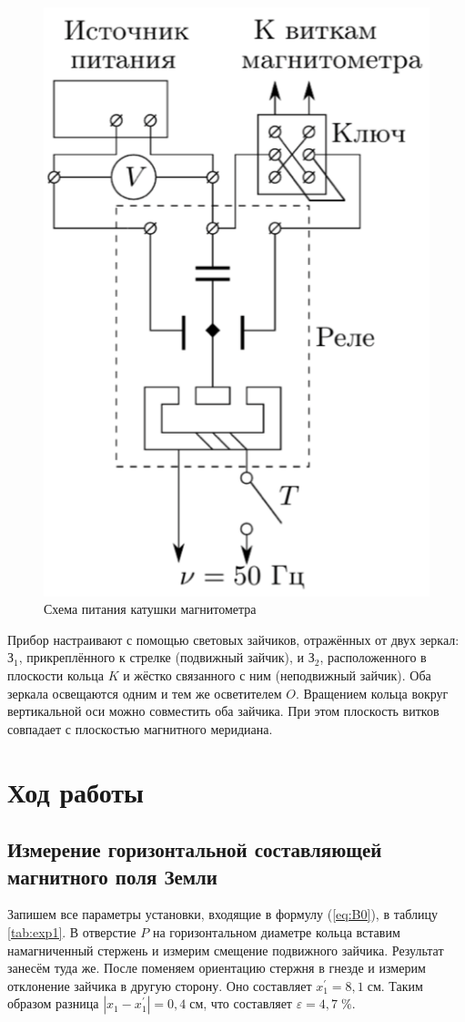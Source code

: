 \documentclass[12pt,a4paper]{article}
\begin{document}
\begin{figure}[H]
	\centering
	\includegraphics[width = 8 cm]{res/coil.png}
	\caption{Схема питания катушки магнитометра}
	\label{fig:coil}
\end{figure}

Прибор настраивают с помощью световых зайчиков, отражённых от
двух зеркал: $\text{З}_1$, прикреплённого к стрелке (подвижный зайчик), и $\text{З}_2$,
расположенного в плоскости кольца $K$ и жёстко связанного с ним (неподвижный зайчик). Оба зеркала освещаются одним и тем же осветителем $O$. Вращением кольца вокруг вертикальной оси можно совместить
оба зайчика. При этом плоскость витков совпадает с плоскостью магнитного меридиана.

\newpage

\section*{Ход работы}

\subsection*{Измерение горизонтальной составляющей магнитного поля Земли}

Запишем все параметры установки, входящие в формулу (\ref{eq:B0}), в таблицу \ref{tab:exp1}. В отверстие $P$ на горизонтальном диаметре кольца вставим
намагниченный стержень и измерим смещение подвижного зайчика. Результат занесём туда же. После поменяем ориентацию стержня в гнезде и измерим отклонение зайчика в другую сторону. Оно составляет $x^\prime_1=8,1 \; \text{см}$. Таким образом разница $|x_1-x^\prime_1|=0,4 \; \text{см}$, что составляет $\varepsilon=4,7\; \%$.
\end{document}
